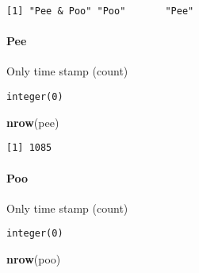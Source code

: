 \documentclass[10,portrait]{article}
\newenvironment{Shaded}{\begin{snugshade}}{\end{snugshade}}
\newcommand{\KeywordTok}[1]{\textcolor[rgb]{0.13,0.29,0.53}{\textbf{#1}}}
\newcommand{\CommentTok}[1]{\textcolor[rgb]{0.56,0.35,0.01}{\textit{#1}}}
\newcommand{\OperatorTok}[1]{\textcolor[rgb]{0.81,0.36,0.00}{\textbf{#1}}}
\newcommand{\NormalTok}[1]{#1}
\let\oldparagraph\paragraph
\renewcommand{\paragraph}[1]{\oldparagraph{#1}\mbox{}}
\begin{document}
\begin{verbatim}
[1] "Pee & Poo" "Poo"       "Pee"      
\end{verbatim}

\paragraph{Pee}\label{pee}

Only time stamp (count)

\begin{Shaded}
\end{Shaded}

\begin{verbatim}
integer(0)
\end{verbatim}

\begin{Shaded}
\begin{Highlighting}[]
\KeywordTok{nrow}\NormalTok{(pee)}
\end{Highlighting}
\end{Shaded}

\begin{verbatim}
[1] 1085
\end{verbatim}

\paragraph{Poo}\label{poo}

Only time stamp (count)

\begin{Shaded}
\end{Shaded}

\begin{verbatim}
integer(0)
\end{verbatim}

\begin{Shaded}
\begin{Highlighting}[]
\KeywordTok{nrow}\NormalTok{(poo)}
\end{Highlighting}
\end{Shaded}
\end{document}
